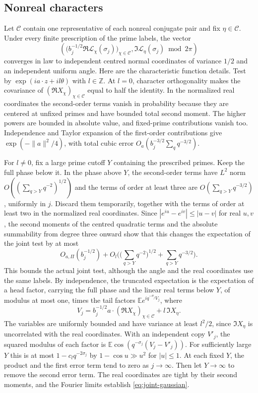 \documentclass[11pt,reqno]{amsart}
\newcommand{\Z}{\mathbb Z}
\newcommand{\EE}{\mathbb E}
\begin{document}
\subsection*{Nonreal characters}
Let \(\mathcal C\) contain one representative of each nonreal conjugate pair and fix \(\eta\in\mathcal C\). Under every finite prescription of the prime labels, the vector
\begin{equation}\label{eq:joint-gaussian}
 \left(
    \big(b_j^{-1/2}\Re\mathcal L_\chi(\sigma_j)\big)_{\chi\in\mathcal C},
    \Im\mathcal L_\eta(\sigma_j)\bmod 2\pi
 \right)
\end{equation}
converges in law to independent centred normal coordinates of variance \(1/2\) and an independent uniform angle. Here are the characteristic function details. Test by \(\exp(i a\cdot z+i l\theta)\) with \(l\in\Z\). At \(l=0\), character orthogonality makes the covariance of \((\Re X_\chi)_{\chi\in\mathcal C}\) equal to half the identity. In the normalized real coordinates the second-order terms vanish in probability because they are centered at unfixed primes and have bounded total second moment. The higher powers are bounded in absolute value, and fixed-prime contributions vanish too. Independence and Taylor expansion of the first-order contributions give \(\exp(-\|a\|^2/4)\), with total cubic error \(O_a(b_j^{-3/2}\sum_q q^{-3/2})\).

For \(l\ne0\), fix a large prime cutoff \(Y\) containing the prescribed primes. Keep the full phase below it. In the phase above \(Y\), the second-order terms have \(L^2\) norm \(O((\sum_{q>Y}q^{-2})^{1/2})\) and the terms of order at least three are \(O(\sum_{q>Y}q^{-3/2})\), uniformly in \(j\). Discard them temporarily, together with the terms of order at least two in the normalized real coordinates. Since \(|e^{iu}-e^{iv}|\le|u-v|\) for real \(u,v\), the second moments of the centred quadratic terms and the absolute summability from degree three onward show that this changes the expectation of the joint test by at most
\[
 O_{a,\Pi}(b_j^{-1/2})
 +O_l\Big(\big(\textstyle\sum_{q>Y}q^{-2}\big)^{1/2}+\sum_{q>Y}q^{-3/2}\Big).
\]
This bounds the actual joint test, although the angle and the real coordinates use the same labels. By independence, the truncated expectation is the expectation of a head factor, carrying the full phase and the linear real terms below \(Y\), of modulus at most one, times the tail factors \(\EE e^{i q^{-\sigma_j} V_j}\), where
\[
 V_j=b_j^{-1/2}a\cdot(\Re X_\chi)_{\chi\in\mathcal C}+l\,\Im X_\eta .
\]
The variables are uniformly bounded and have variance at least \(l^2/2\), since \(\Im X_\eta\) is uncorrelated with the real coordinates. With an independent copy \(V'_j\), the squared modulus of each factor is \(\EE\cos(q^{-\sigma_j}(V_j-V'_j))\). For sufficiently large \(Y\) this is at most \(1-c_l q^{-2\sigma_j}\) by \(1-\cos u\gg u^2\) for \(|u|\le1\). At each fixed \(Y\), the product and the first error term tend to zero as \(j\to\infty\). Then let \(Y\to\infty\) to remove the second error term. The real coordinates are tight by their second moments, and the Fourier limits establish \eqref{eq:joint-gaussian}.
\end{document}
